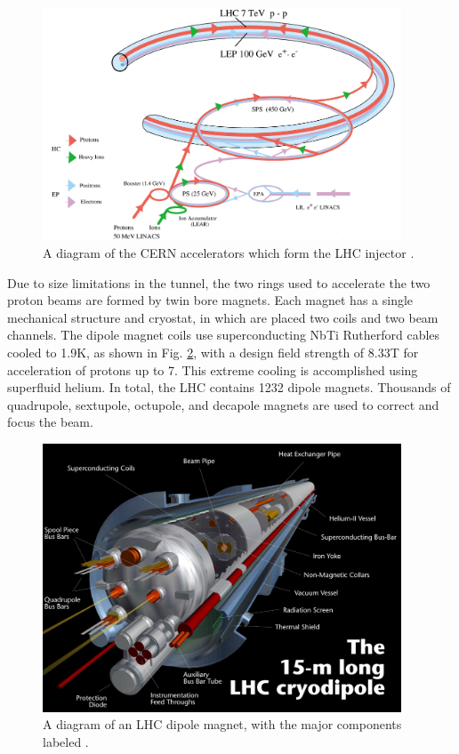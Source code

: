 \documentclass[12pt]{thesis}  %
\begin{document}
\begin{figure}[hbt]
\begin{center}
\includegraphics[width=0.95\textwidth]{figures/lhc-pho-1993-008.png}
\caption{A diagram of the CERN accelerators which form the LHC injector \cite{Jean-Luc:841568}.}
\label{fig:lhc-injectors}
\end{center}
\end{figure}

Due to size limitations in the tunnel, the two rings used to accelerate the two proton beams are formed by twin bore magnets. Each magnet has a single mechanical structure and cryostat, in which are placed two coils and two beam channels. The dipole magnet coils use superconducting NbTi Rutherford cables cooled to 1.9\unit{K}, as shown in Fig. \ref{fig:lhc-dipole}, with a design field strength of 8.33\unit{T} for acceleration of protons up to 7\TeV. This extreme cooling is accomplished using superfluid helium. In total, the LHC contains 1232 dipole magnets. Thousands of quadrupole, sextupole, octupole, and decapole magnets are used to correct and focus the beam.

\begin{figure}[hbt]
\begin{center}
\includegraphics[width=0.95\textwidth]{figures/lhc-pho-1998-299.jpg}
\caption{A diagram of an LHC dipole magnet, with the major components labeled \cite{Dailler:842253}.}
\label{fig:lhc-dipole}
\end{center}
\end{figure}
\end{document}
